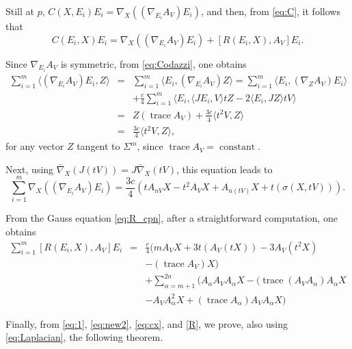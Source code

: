 \documentclass[11pt]{amsart}
\theoremstyle{plain}
\theoremstyle{definition}
\DeclareMathOperator{\trace}{trace} \DeclareMathOperator{\di}{div}
\DeclareMathOperator{\cst}{constant}
\numberwithin{equation}{section}
\begin{document}
Still at $p$, $C(X,E_i)E_i=\nabla_{X}((\nabla_{E_i}A_V)E_i)$,
and then, from \eqref{eq:C}, it follows that
\begin{equation}\label{eq:new2}
C(E_i,X)E_i=\nabla_{X}((\nabla_{E_i}A_V)E_i)+[R(E_i,X),A_V]E_i.
\end{equation}

Since $\nabla_{E_i}A_V$ is symmetric, from \eqref{eq:Codazzi}, one obtains
\begin{eqnarray*}
\sum_{i=1}^m\langle(\nabla_{E_i}A_V)E_i,Z\rangle&=&\sum_{i=1}^m\langle E_i,(\nabla_{E_i}A_V)Z\rangle=\sum_{i=1}^m\langle E_i,(\nabla_{Z}A_V)E_i\rangle\\\nonumber &&+\frac{c}{4}\sum_{i=1}^m\langle E_i,\langle JE_i,V\rangle tZ-2\langle E_i,JZ\rangle tV\rangle\\\nonumber &=&Z(\trace A_V)+\frac{3c}{4}\langle t^2V,Z\rangle\\\nonumber &=&\frac{3c}{4}\langle t^2V,Z\rangle,
\end{eqnarray*}
for any vector $Z$ tangent to $\Sigma^m$, since $\trace A_V=\cst$. 

Next, using $\bar\nabla_X(J(tV))=J\bar\nabla_X(tV)$, this equation leads to
\begin{equation}\label{eq:cx}
\sum_{i=1}^m\nabla_{X}((\nabla_{E_i}A_V)E_i)=\frac{3c}{4}\left(tA_{nV}X-t^2A_VX+A_{n(tV)}X+t(\sigma(X,tV))\right).
\end{equation}

From the Gauss equation \eqref{eq:R_cpn}, after a straightforward
computation, one obtains
\begin{eqnarray}\label{R}
\sum_{i=1}^m[R(E_i,X),A_V]E_i&=&\frac{c}{4}(mA_VX+3t(A_V(tX))-3A_V(t^2X)\\\nonumber &&-(\trace A_V)X)\\\nonumber &&+\sum_{\alpha=m+1}^{2n}(A_{\alpha}A_VA_{\alpha}X-(\trace(A_VA_{\alpha})A_{\alpha}X\\\nonumber &&-A_VA_{\alpha}^2X+(\trace A_{\alpha})A_VA_{\alpha}X)
\end{eqnarray}

Finally, from \eqref{eq:1}, \eqref{eq:new2}, \eqref{eq:cx}, and \eqref{R}, we prove, also using \eqref{eq:Laplacian}, the following theorem.
\end{document}
